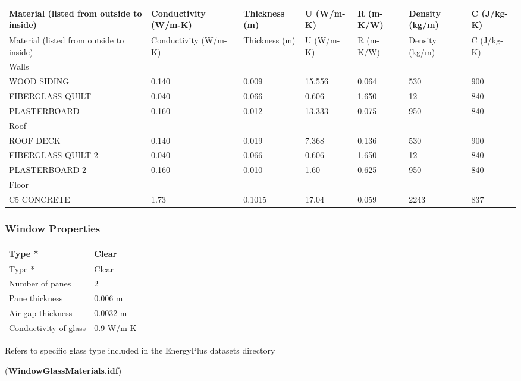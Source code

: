 {\scriptsize
\begin{longtable}[c]{>{\raggedright}p{0.85in}>{\raggedright}p{0.85in}>{\raggedright}p{0.85in}>{\raggedright}p{0.85in}>{\raggedright}p{0.85in}>{\raggedright}p{0.85in}>{\raggedright}p{0.85in}}
\toprule
Material (listed from outside to inside) & Conductivity (W/m-K) & Thickness (m) & U (W/m-K) & R (m-K/W) & Density (kg/m) & C (J/kg-K) \tabularnewline
\midrule
\endfirsthead

\toprule
Material (listed from outside to inside) & Conductivity (W/m-K) & Thickness (m) & U (W/m-K) & R (m-K/W) & Density (kg/m) & C (J/kg-K) \tabularnewline
\midrule
\endhead

Walls & ~ & ~ & ~ & ~ & ~ & ~ \tabularnewline
WOOD SIDING\--1 & 0.140 & 0.009 & 15.556 & 0.064 & 530 & 900 \tabularnewline
FIBERGLASS QUILT\--1 & 0.040 & 0.066 & 0.606 & 1.650 & 12 & 840 \tabularnewline
PLASTER\-BOARD\--1 & 0.160 & 0.012 & 13.333 & 0.075 & 950 & 840 \tabularnewline
Roof & ~ & ~ & ~ & ~ & ~ & ~ \tabularnewline
ROOF DECK & 0.140 & 0.019 & 7.368 & 0.136 & 530 & 900 \tabularnewline
FIBERGLASS QUILT-2 & 0.040 & 0.066 & 0.606 & 1.650 & 12 & 840 \tabularnewline
PLASTER\-BOARD-2 & 0.160 & 0.010 & 1.60 & 0.625 & 950 & 840 \tabularnewline
Floor & ~ & ~ & ~ & ~ & ~ & ~ \tabularnewline
C5 CONCRETE & 1.73 & 0.1015 & 17.04 & 0.059 & 2243 & 837 \tabularnewline
\bottomrule
\end{longtable}}

\subsubsection{Window Properties}\label{window-properties}

\begin{longtable}[c]{@{}ll@{}}
\toprule
Type * & Clear \tabularnewline
\midrule
\endfirsthead

\toprule
Type * & Clear \tabularnewline
\midrule
\endhead

Number of panes & 2 \tabularnewline
Pane thickness & 0.006 m \tabularnewline
Air-gap thickness & 0.0032 m \tabularnewline
Conductivity of glass & 0.9 W/m-K \tabularnewline
\bottomrule
\end{longtable}

Refers to specific glass type included in the EnergyPlus datasets directory

(\textbf{WindowGlassMaterials.idf})

